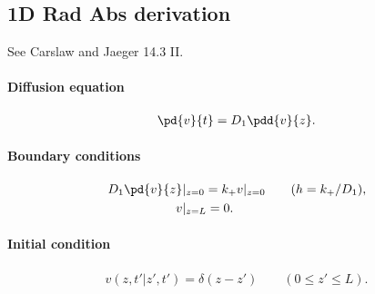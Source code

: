 \subsection{1D Rad Abs derivation}

See Carslaw and Jaeger 14.3 II.


\paragraph{Diffusion equation}
\begin{align}
  \pd{v}{t} = D_1 \pdd{v}{z}.
\end{align}


\paragraph{Boundary conditions}
\begin{align}
  \left.D_1\pd{v}{z}\right|&_{z=0} = k_+ v|_{z=0}
  \qquad (h = k_+/D_1),\\
  v|&_{z=L}=0.
\end{align}


\paragraph{Initial condition}
\begin{align}
  v(z,t'|z',t') = \delta(z-z') \qquad (0 \leq z' \leq L).
\end{align}
